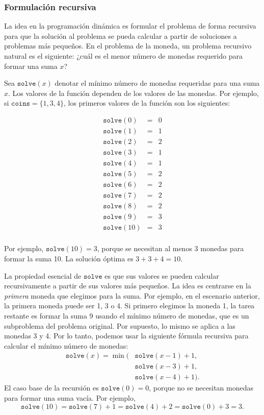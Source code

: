 \subsubsection{Formulación recursiva}

La idea en la programación dinámica es
formular el problema de forma recursiva para que
la solución al problema se pueda
calcular a partir de soluciones a problemas más pequeños.
En el problema de la moneda, un problema recursivo natural
es el siguiente:
¿cuál es el menor número de monedas
requerido para formar una suma $x$?

Sea $\texttt{solve}(x)$
denotar el mínimo
número de monedas requeridas para una suma $x$.
Los valores de la función dependen de los
valores de las monedas.
Por ejemplo, si $\texttt{coins} = \{1,3,4\}$,
los primeros valores de la función son los siguientes:

\[
\begin{array}{lcl}
\texttt{solve}(0) & = & 0 \\
\texttt{solve}(1) & = & 1 \\
\texttt{solve}(2) & = & 2 \\
\texttt{solve}(3) & = & 1 \\
\texttt{solve}(4) & = & 1 \\
\texttt{solve}(5) & = & 2 \\
\texttt{solve}(6) & = & 2 \\
\texttt{solve}(7) & = & 2 \\
\texttt{solve}(8) & = & 2 \\
\texttt{solve}(9) & = & 3 \\
\texttt{solve}(10) & = & 3 \\
\end{array}
\]

Por ejemplo, $\texttt{solve}(10)=3$,
porque se necesitan al menos 3 monedas
para formar la suma 10.
La solución óptima es $3+3+4=10$.

La propiedad esencial de $\texttt{solve}$ es
que sus valores se pueden
calcular recursivamente a partir de sus valores más pequeños.
La idea es centrarse en la \emph{primera}
moneda que elegimos para la suma.
Por ejemplo, en el escenario anterior,
la primera moneda puede ser 1, 3 o 4.
Si primero elegimos la moneda 1,
la tarea restante es formar la suma 9
usando el mínimo número de monedas,
que es un subproblema del problema original.
Por supuesto, lo mismo se aplica a las monedas 3 y 4.
Por lo tanto, podemos usar la siguiente fórmula recursiva
para calcular el mínimo número de monedas:
\begin{equation*}
\begin{split}
\texttt{solve}(x) = \min( & \texttt{solve}(x-1)+1, \\
                           & \texttt{solve}(x-3)+1, \\
                           & \texttt{solve}(x-4)+1).
\end{split}
\end{equation*}
El caso base de la recursión es $\texttt{solve}(0)=0$,
porque no se necesitan monedas para formar una suma vacía.
Por ejemplo,
\[ \texttt{solve}(10) = \texttt{solve}(7)+1 = \texttt{solve}(4)+2 = \texttt{solve}(0)+3 = 3.\]

